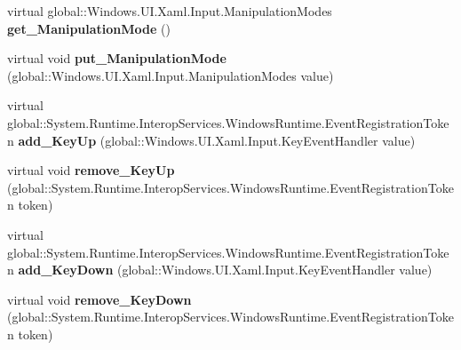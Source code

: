 \begin{DoxyCompactItemize}
\item 
\mbox{\label{class_windows_1_1_u_i_1_1_xaml_1_1_u_i_element_a144176607f6318a776be9a5bd0836be5}} 
virtual global\+::\+Windows.\+U\+I.\+Xaml.\+Input.\+Manipulation\+Modes {\bfseries get\+\_\+\+Manipulation\+Mode} ()
\item 
\mbox{\label{class_windows_1_1_u_i_1_1_xaml_1_1_u_i_element_a2d57a47a49d348fcb616d78e70fbb023}} 
virtual void {\bfseries put\+\_\+\+Manipulation\+Mode} (global\+::\+Windows.\+U\+I.\+Xaml.\+Input.\+Manipulation\+Modes value)
\item 
\mbox{\label{class_windows_1_1_u_i_1_1_xaml_1_1_u_i_element_ae3fbd9d6083ca5ff6d54b03c98f3ddd0}} 
virtual global\+::\+System.\+Runtime.\+Interop\+Services.\+Windows\+Runtime.\+Event\+Registration\+Token {\bfseries add\+\_\+\+Key\+Up} (global\+::\+Windows.\+U\+I.\+Xaml.\+Input.\+Key\+Event\+Handler value)
\item 
\mbox{\label{class_windows_1_1_u_i_1_1_xaml_1_1_u_i_element_a9b0df5770c1290041beafa550462cc33}} 
virtual void {\bfseries remove\+\_\+\+Key\+Up} (global\+::\+System.\+Runtime.\+Interop\+Services.\+Windows\+Runtime.\+Event\+Registration\+Token token)
\item 
\mbox{\label{class_windows_1_1_u_i_1_1_xaml_1_1_u_i_element_a58b82f2b844e4c525c9caa9f4dea423b}} 
virtual global\+::\+System.\+Runtime.\+Interop\+Services.\+Windows\+Runtime.\+Event\+Registration\+Token {\bfseries add\+\_\+\+Key\+Down} (global\+::\+Windows.\+U\+I.\+Xaml.\+Input.\+Key\+Event\+Handler value)
\item 
\mbox{\label{class_windows_1_1_u_i_1_1_xaml_1_1_u_i_element_a20e6427c1bb47624dae8e067c2fcf806}} 
virtual void {\bfseries remove\+\_\+\+Key\+Down} (global\+::\+System.\+Runtime.\+Interop\+Services.\+Windows\+Runtime.\+Event\+Registration\+Token token)
\item 
\mbox{\label{class_windows_1_1_u_i_1_1_xaml_1_1_u_i_element_acf97b246d988b08971b2521c2500b00b}} 

\end{DoxyCompactItemize}
